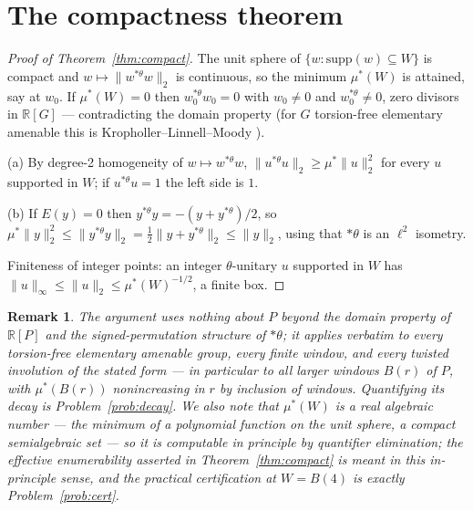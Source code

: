 \documentclass[11pt]{article}
\newtheorem{remark}[theorem]{Remark}
\newcommand{\RR}{\mathbb{R}}
\newcommand{\thst}{{*\theta}}
\newcommand{\supp}{\mathrm{supp}}
\begin{document}
\section{The compactness theorem}\label{sec:compact}

\begin{proof}[Proof of Theorem~\ref{thm:compact}]
The unit sphere of $\{w:\supp(w)\subseteq W\}$ is compact and
$w\mapsto \|w^{\thst}w\|_2$ is continuous, so the minimum
$\mu^*(W)$ is attained, say at $w_0$.  If $\mu^*(W)=0$ then
$w_0^{\thst}w_0=0$ with $w_0\ne 0$ and $w_0^{\thst}\neq0$, zero
divisors in $\RR[G]$ --- contradicting the domain property (for
$G$ torsion-free elementary amenable this is
Kropholler--Linnell--Moody \cite{KLM}).

(a) By degree-2 homogeneity of $w\mapsto w^{\thst}w$,
$\|u^{\thst}u\|_2\ge\mu^*\|u\|_2^2$ for every $u$ supported in $W$;
if $u^{\thst}u=1$ the left side is $1$.

(b) If $E(y)=0$ then $y^{\thst}y=-(y+y^{\thst})/2$, so
$\mu^*\|y\|_2^2\le\|y^{\thst}y\|_2=\tfrac12\|y+y^{\thst}\|_2\le
\|y\|_2$, using that $\thst$ is an $\ell^2$ isometry.

Finiteness of integer points: an integer $\theta$-unitary $u$
supported in $W$ has $\|u\|_\infty\le\|u\|_2\le\mu^*(W)^{-1/2}$, a
finite box.
\end{proof}

\begin{remark}\label{rem:general}
The argument uses nothing about $P$ beyond the domain property of
$\RR[P]$ and the signed-permutation structure of $\thst$; it applies
verbatim to every torsion-free elementary amenable group, every
finite window, and every twisted involution of the stated form ---
in particular to all larger windows $B(r)$ of $P$, with
$\mu^*(B(r))$ nonincreasing in $r$ by inclusion of windows.
Quantifying its decay is Problem~\ref{prob:decay}.  We also note that
$\mu^*(W)$ is a real algebraic number --- the minimum of a polynomial
function on the unit sphere, a compact semialgebraic set --- so it is
computable in principle by quantifier elimination; the effective
enumerability asserted in Theorem~\ref{thm:compact} is meant in this
in-principle sense, and the practical certification at $W=B(4)$ is
exactly Problem~\ref{prob:cert}.
\end{remark}
\end{document}
